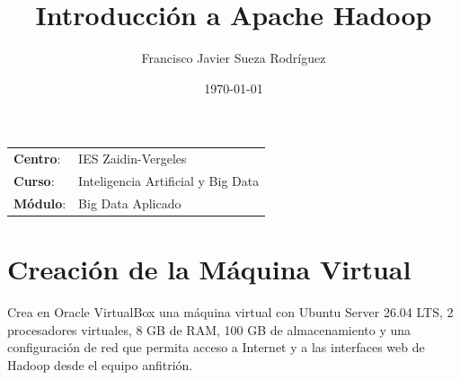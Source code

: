 


\title{
\vspace{10ex}
\normalfont \normalsize
\huge \textbf{Introducción a Apache Hadoop}
}
\author{Francisco Javier Sueza Rodríguez}
\date{\normalsize\today}

\glsenablehyper
\makeglossaries
{}




\maketitle

\thispagestyle{empty}

\vspace{75ex}

\begin{center}
    \begin{tabular}{l l}
        \textbf{Centro}: & IES Zaidin-Vergeles \\
        \textbf{Curso}: & Inteligencia Artificial y Big Data\\
        \textbf{Módulo}: & Big Data Aplicado \\
    \end{tabular}
\end{center}

\newpage

\begingroup
\hypersetup{linkcolor=black}
\tableofcontents
\endgroup

\newpage

\begingroup
\hypersetup{linkcolor=black}
\listoffigures             
\endgroup

\newpage

\section{Creación de la Máquina Virtual}
Crea en Oracle VirtualBox una máquina virtual con Ubuntu Server 26.04 LTS, 2 procesadores virtuales, 8 GB de RAM, 100 GB de almacenamiento y una configuración de red que permita acceso a Internet y a las interfaces web de Hadoop desde el equipo anfitrión.

